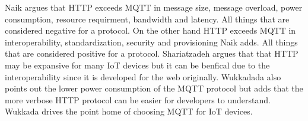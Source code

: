 Naik argues that HTTP exceeds MQTT in message size, message overload, power consumption, resource requirment, bandwidth and latency. 
All things that are considered negative for a protocol. \cite{Naik2017}
On the other hand HTTP exceeds MQTT in interoperability, standardization, security and provisioning Naik adds. \cite{Naik2017}
All things that are considered positive for a protocol.
Shariatzadeh argues that that HTTP may be expansive for many IoT devices but it can be benfical due to the interoperability since it is developed for the web originally. \cite{Shariatzadeh2016}
Wukkadada also points out the lower power consumption of the MQTT protocol but adds that the more verbose HTTP protocol can be easier for developers to understand. \cite{Wukkadada2018}
Wukkada drives the point home of choosing MQTT for IoT devices. \cite{Wukkadada2018}